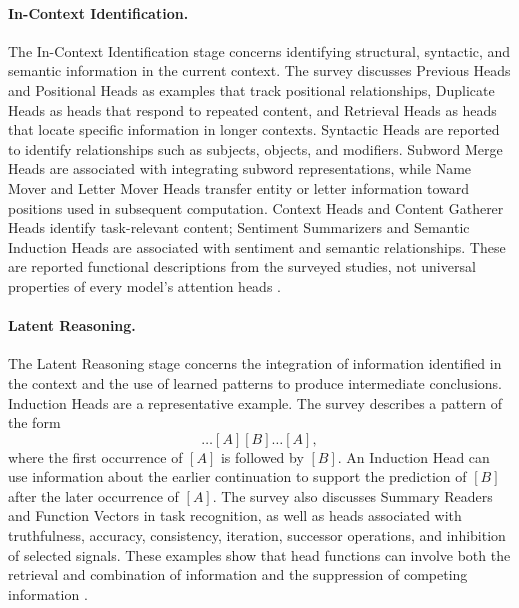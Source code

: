 \paragraph{In-Context Identification.}
The In-Context Identification stage concerns identifying structural,
syntactic, and semantic information in the current context. The survey
discusses Previous Heads and Positional Heads as examples that track
positional relationships, Duplicate Heads as heads that respond to
repeated content, and Retrieval Heads as heads that locate specific
information in longer contexts. Syntactic Heads are reported to identify
relationships such as subjects, objects, and modifiers. Subword Merge
Heads are associated with integrating subword representations, while
Name Mover and Letter Mover Heads transfer entity or letter information
toward positions used in subsequent computation. Context Heads and
Content Gatherer Heads identify task-relevant content; Sentiment
Summarizers and Semantic Induction Heads are associated with sentiment
and semantic relationships. These are reported functional descriptions
from the surveyed studies, not universal properties of every model's
attention heads \parencite{zheng2024attentionheads}.

\paragraph{Latent Reasoning.}
The Latent Reasoning stage concerns the integration of information
identified in the context and the use of learned patterns to produce
intermediate conclusions. Induction Heads are a representative example.
The survey describes a pattern of the form
\begin{equation}
    \ldots [A][B]\ldots[A],
    \label{eq:attn-induction-pattern}
\end{equation}
where the first occurrence of \([A]\) is followed by \([B]\). An Induction
Head can use information about the earlier continuation to support the
prediction of \([B]\) after the later occurrence of \([A]\). The survey
also discusses Summary Readers and Function Vectors in task recognition,
as well as heads associated with truthfulness, accuracy, consistency,
iteration, successor operations, and inhibition of selected signals.
These examples show that head functions can involve both the retrieval
and combination of information and the suppression of competing
information \parencite{zheng2024attentionheads}.

